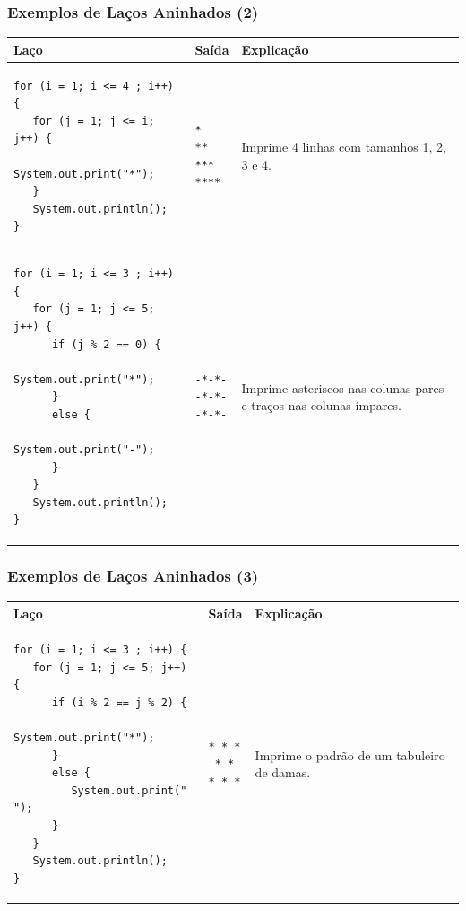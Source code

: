 \documentclass[xcolor={dvipsnames,table},aspectratio=169]{beamer}
\begin{document}
\begin{frame}[fragile]\frametitle{Exemplos de Laços Aninhados (2)}
\begin{center}
  \begin{tabular}{|p{6cm}|p{2cm}|p{5cm}|}
\hline
    \textbf{Laço} & \textbf{Saída} & \textbf{Explicação} \\
\hline
{\tiny
\begin{verbatim}
for (i = 1; i <= 4 ; i++) {
   for (j = 1; j <= i; j++) {
      System.out.print("*");
   }
   System.out.println();
}
\end{verbatim}
}
&
{\tiny
\begin{verbatim}
*
**
***
****
\end{verbatim}
}
& Imprime 4 linhas com tamanhos 1, 2, 3 e 4.\\
\hline
{\tiny
\begin{verbatim}
for (i = 1; i <= 3 ; i++) {
   for (j = 1; j <= 5; j++) {
      if (j % 2 == 0) {
         System.out.print("*");
      }
      else {
         System.out.print("-");
      }
   }
   System.out.println();
}
\end{verbatim}
}
&
{\tiny
\begin{verbatim}
-*-*-
-*-*-
-*-*-
\end{verbatim}
}
& Imprime asteriscos nas colunas pares e traços nas colunas ímpares.\\
\hline
  \end{tabular}
\end{center}
\end{frame}

\begin{frame}[fragile]\frametitle{Exemplos de Laços Aninhados (3)}
\begin{center}
  \begin{tabular}{|p{6cm}|p{2cm}|p{5cm}|}
\hline
    \textbf{Laço} & \textbf{Saída} & \textbf{Explicação} \\
\hline
{\tiny
\begin{verbatim}
for (i = 1; i <= 3 ; i++) {
   for (j = 1; j <= 5; j++) {
      if (i % 2 == j % 2) {
         System.out.print("*");
      }
      else {
         System.out.print(" ");
      }
   }
   System.out.println();
}
\end{verbatim}
}
&
{\tiny
\begin{verbatim}
* * *
 * * 
* * *
\end{verbatim}
}
& Imprime o padrão de um tabuleiro de damas.\\
\hline
  \end{tabular}
\end{center}
\end{frame}
\end{document}
